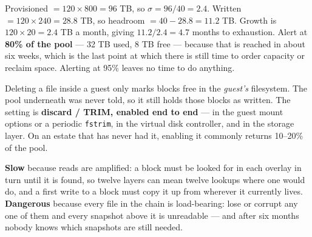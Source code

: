 \begin{ans}
  \item Provisioned $= 120 \times 800 = 96$ TB, so
        $\sigma = 96/40 = \mathbf{2.4}$. Written $= 120 \times 240 = 28.8$ TB,
        so headroom $= 40 - 28.8 = \mathbf{11.2}$ TB. Growth is
        $120 \times 20 = 2.4$ TB a month, giving
        $11.2/2.4 = \mathbf{4.7}$ months to exhaustion. Alert at \textbf{80\% of
        the pool} --- 32 TB used, 8 TB free --- because that is reached in about
        six weeks, which is the last point at which there is still time to
        order capacity or reclaim space. Alerting at 95\% leaves no time to do
        anything.
  \item Deleting a file inside a guest only marks blocks free in the
        \emph{guest's} filesystem. The pool underneath was never told, so it
        still holds those blocks as written. The setting is \textbf{discard /
        TRIM, enabled end to end} --- in the guest mount options or a periodic
        \texttt{fstrim}, in the virtual disk controller, and in the storage
        layer. On an estate that has never had it, enabling it commonly returns
        10--20\% of the pool.
  \item \textbf{Slow} because reads are amplified: a block must be looked for in
        each overlay in turn until it is found, so twelve layers can mean twelve
        lookups where one would do, and a first write to a block must copy it up
        from wherever it currently lives. \textbf{Dangerous} because every file
        in the chain is load-bearing: lose or corrupt any one of them and every
        snapshot above it is unreadable --- and after six months nobody knows
        which snapshots are still needed.
\end{ans}

